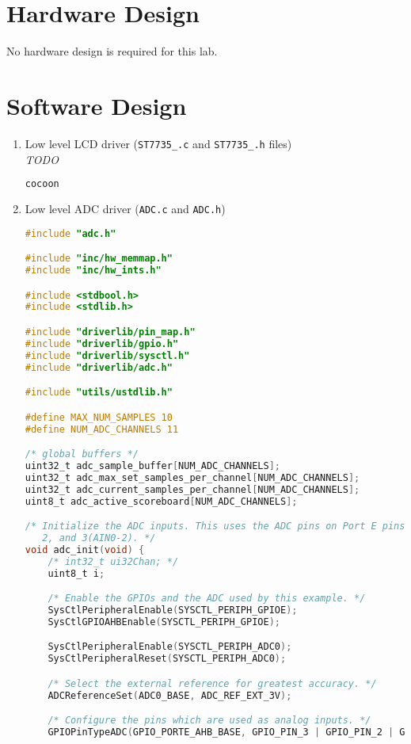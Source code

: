 \documentclass[12pt]{article}
\newcommand{\todo}{{\LARGE \emph{\color{red}TODO}}}
\begin{document}
\section{Hardware Design}
No hardware design is required for this lab.
\section{Software Design}
\begin{enumerate}[1)]
\item Low level LCD driver (\verb|ST7735_.c| and \verb|ST7735_.h|
  files) \\

  \todo
  \begin{lstlisting}[language=C]
    cocoon
  \end{lstlisting}
\item Low level ADC driver (\verb|ADC.c| and \verb|ADC.h|) \\
  \begin{lstlisting}[language=C]
    #include "adc.h"

#include "inc/hw_memmap.h"
#include "inc/hw_ints.h"

#include <stdbool.h>
#include <stdlib.h>

#include "driverlib/pin_map.h"
#include "driverlib/gpio.h"
#include "driverlib/sysctl.h"
#include "driverlib/adc.h"

#include "utils/ustdlib.h"

#define MAX_NUM_SAMPLES 10
#define NUM_ADC_CHANNELS 11

/* global buffers */
uint32_t adc_sample_buffer[NUM_ADC_CHANNELS];
uint32_t adc_max_set_samples_per_channel[NUM_ADC_CHANNELS];
uint32_t adc_current_samples_per_channel[NUM_ADC_CHANNELS];
uint8_t adc_active_scoreboard[NUM_ADC_CHANNELS];

/* Initialize the ADC inputs. This uses the ADC pins on Port E pins 1,
   2, and 3(AIN0-2). */
void adc_init(void) {
    /* int32_t ui32Chan; */
    uint8_t i;

    /* Enable the GPIOs and the ADC used by this example. */
    SysCtlPeripheralEnable(SYSCTL_PERIPH_GPIOE);
    SysCtlGPIOAHBEnable(SYSCTL_PERIPH_GPIOE);

    SysCtlPeripheralEnable(SYSCTL_PERIPH_ADC0);
    SysCtlPeripheralReset(SYSCTL_PERIPH_ADC0);

    /* Select the external reference for greatest accuracy. */
    ADCReferenceSet(ADC0_BASE, ADC_REF_EXT_3V);

    /* Configure the pins which are used as analog inputs. */
    GPIOPinTypeADC(GPIO_PORTE_AHB_BASE, GPIO_PIN_3 | GPIO_PIN_2 | GPIO_PIN_1);


\end{lstlisting}
\end{enumerate}
\end{document}
